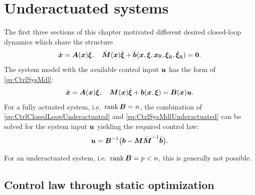 \section{Underactuated systems}\label{sec:CtrlUnderactuated}
The first three sections of this chapter motivated different desired closed-loop dynamics which share the structure
\begin{align}\label{eq:CtrlClosedLoopUnderactuated}
 \dot{\boldsymbol{x}} = \boldsymbol{A}(\boldsymbol{x}) \boldsymbol{\xi}, 
\quad
 \bar{\boldsymbol{M}}(\boldsymbol{x}) \dot{\boldsymbol{\xi}} + \bar{\boldsymbol{b}}(\boldsymbol{x}, \boldsymbol{\xi}, \boldsymbol{x}_{\mathsf{R}}, \boldsymbol{\xi}_{\mathsf{R}}, \dot{\boldsymbol{\xi}}_{\mathsf{R}}) = \boldsymbol{0}.
\end{align}
The system model with the available control input $\boldsymbol{u}$ has the form of \eqref{eq:CtrlSysMdl}:
\begin{align}\label{eq:CtrlSysMdlUnderactuated}
 \dot{\boldsymbol{x}} = \boldsymbol{A}(\boldsymbol{x}) \boldsymbol{\xi}, 
\quad
 \boldsymbol{M}(\boldsymbol{x}) \dot{\boldsymbol{\xi}} + \boldsymbol{b}(\boldsymbol{x}, \boldsymbol{\xi}) = \boldsymbol{B}(\boldsymbol{x}) \boldsymbol{u}.
\end{align}
For a fully actuated system, i.e.\ $\operatorname{rank}\boldsymbol{B} = n$, the combination of \eqref{eq:CtrlClosedLoopUnderactuated} and \eqref{eq:CtrlSysMdlUnderactuated} can be solved for the system input $\boldsymbol{u}$ yielding the required control law:
\begin{align}
 \boldsymbol{u} = \boldsymbol{B}^{-1}\big( \boldsymbol{b} - \boldsymbol{M} \bar{\boldsymbol{M}}^{-1} \bar{\boldsymbol{b}} \big)
 .
\end{align}

For an underactuated system, i.e.\ $\operatorname{rank}\boldsymbol{B} = p < n$, this is generally not possible.


\subsection{Control law through static optimization}\label{sec:CtrlUnderactuatedOptim}


